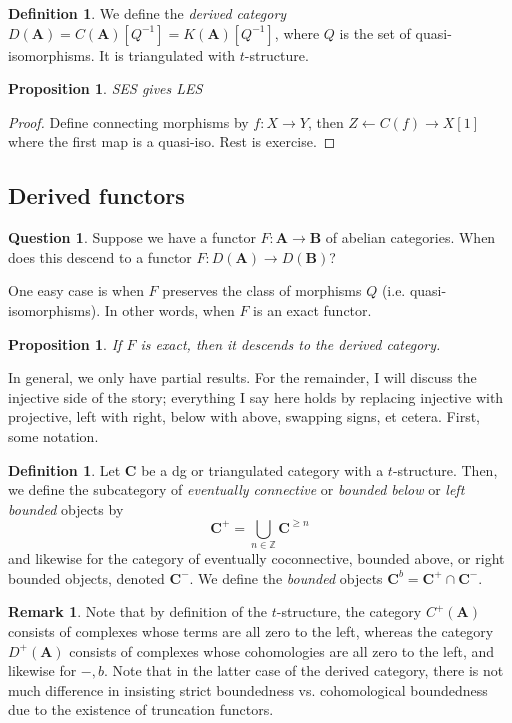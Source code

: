 \documentclass[10pt]{article}
\newtheorem{prop}[thm]{Proposition}
\theoremstyle{definition}
\newtheorem{defn}[thm]{Definition}
\newtheorem{rmk}[thm]{Remark}
\newtheorem{question}[thm]{Question}
\newcommand{\cat}{\mathbf}
\newcommand{\Z}{\mathbb{Z}}
\begin{document}
\begin{defn}
We define the \emph{derived category} $D(\cat{A}) = C(\cat{A})[Q^{-1}] = K(\cat{A})[Q^{-1}]$, where $Q$ is the set of quasi-isomorphisms.  It is triangulated with $t$-structure.
\end{defn}


\begin{prop}
SES gives LES
\end{prop}
\begin{proof}
Define connecting morphisms by $f: X \rightarrow Y$, then $Z \leftarrow C(f) \rightarrow X[1]$ where the first map is a quasi-iso.  Rest is exercise.
\end{proof}


\subsection{Derived functors}

\begin{question}
Suppose we have a functor $F: \cat{A} \rightarrow \cat{B}$ of abelian categories.  When does this descend to a functor $F: D(\cat{A}) \rightarrow D(\cat{B})$?
\end{question}

One easy case is when $F$ preserves the class of morphisms $Q$ (i.e. quasi-isomorphisms).  In other words, when $F$ is an exact functor.
\begin{prop}
If $F$ is exact, then it descends to the derived category.
\end{prop}

In general, we only have partial results.  For the remainder, I will discuss the injective side of the story; everything I say here holds by replacing injective with projective, left with right, below with above, swapping signs, et cetera.  First, some notation.
\begin{defn}
Let $\cat{C}$ be a dg or triangulated category with a $t$-structure.  Then, we define the subcategory of \emph{eventually connective} or \emph{bounded below} or \emph{left bounded} objects by
$$\cat{C}^+ = \bigcup_{n \in \Z} \cat{C}^{\geq n}$$
and likewise for the category of eventually coconnective, bounded above, or right bounded objects, denoted $\cat{C}^-$.  We define the \emph{bounded} objects $\cat{C}^b = \cat{C}^+ \cap \cat{C}^-$.
\end{defn}

\begin{rmk}
Note that by definition of the $t$-structure, the category $C^+(\cat{A})$ consists of complexes whose terms are all zero to the left, whereas the category $D^+(\cat{A})$ consists of complexes whose cohomologies are all zero to the left, and likewise for $-, b$.  Note that in the latter case of the derived category, there is not much difference in insisting strict boundedness vs. cohomological boundedness due to the existence of truncation functors.
\end{rmk}
\end{document}

